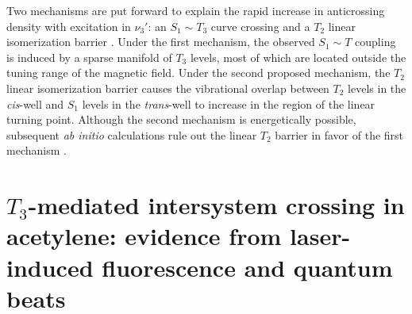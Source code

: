 Two mechanisms are put forward to explain the rapid increase in
anticrossing density with excitation in $\nu_3'$: an $S_1 \sim T_3$
curve crossing and a $T_2$ linear isomerization barrier \cite{dupre91,
  dupre95b}.  Under the first mechanism, the observed $S_1 \sim T$
coupling is induced by a sparse manifold of $T_3$ levels, most of
which are located outside the tuning range of the magnetic field.
Under the second proposed mechanism, the $T_2$ linear isomerization
barrier causes the vibrational overlap between $T_2$ levels in the
\emph{cis}-well and $S_1$ levels in the \emph{trans}-well to increase
in the region of the linear turning point.  Although the second
mechanism is energetically possible, subsequent \emph{ab initio}
calculations rule out the linear $T_2$ barrier in favor of the first
mechanism \cite{vacek96, sherrill96, cui96, cui97, ventura03}.




\section{$T_3$-mediated intersystem crossing in acetylene: evidence
  from laser-induced fluorescence and quantum beats}

